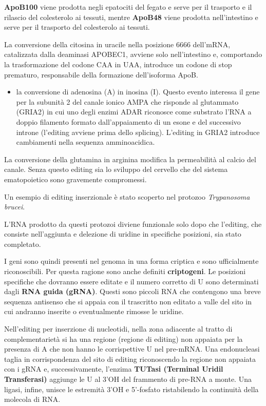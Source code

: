 \documentclass[11pt]{book}
\begin{document}
\textbf{ApoB100} viene prodotta negli epatociti del fegato e serve per
il trasporto e il rilascio del colesterolo ai tessuti, mentre
\textbf{ApoB48} viene prodotta nell'intestino e serve per il trasporto
del colesterolo ai tessuti.

La conversione della citosina in uracile nella posizione 6666 dell'mRNA,
catalizzata dalla deaminasi APOBEC1, avviene solo nell'intestino e,
comportando la trasformazione del codone CAA in UAA, introduce un codone
di stop prematuro, responsabile della formazione dell'isoforma ApoB.

\begin{itemize}
\itemsep1pt\parskip0pt
\item
  la conversione di adenosina (A) in inosina (I). Questo evento
  interessa il gene per la subunità 2 del canale ionico AMPA che
  risponde al glutammato (GRIA2) in cui uno degli enzimi ADAR riconosce
  come substrato l'RNA a doppio filamento formato dall'appaiamento di un
  esone e del successivo introne (l'editing avviene prima dello
  splicing). L'editing in GRIA2 introduce cambiamenti nella sequenza
  amminoacidica.
\end{itemize}

La conversione della glutamina in arginina modifica la permeabilità al
calcio del canale. Senza questo editing sia lo sviluppo del cervello che
del sistema ematopoietico sono gravemente compromessi.

Un esempio di editing inserzionale è stato scoperto nel protozoo
\emph{Trypanosoma brucei}.

L'RNA prodotto da questi protozoi diviene funzionale solo dopo che
l'editing, che consiste nell'aggiunta e delezione di uridine in
specifiche posizioni, sia stato completato.

I geni sono quindi presenti nel genoma in una forma criptica e sono
ufficialmente riconoscibili. Per questa ragione sono anche definiti
\textbf{criptogeni}. Le posizioni specifiche che dovranno essere editate
e il numero corretto di U sono determinati dagli \textbf{RNA guida
(gRNA)}. Questi sono piccoli RNA che contengono una breve sequenza
antisenso che si appaia con il trascritto non editato a valle del sito
in cui andranno inserite o eventualmente rimosse le uridine.

Nell'editing per inserzione di nucleotidi, nella zona adiacente al
tratto di complementarietà si ha una regione (regione di editing) non
appaiata per la presenza di A che non hanno le corrispettive U nel
pre-mRNA. Una endonucleasi taglia in corrispondenza del sito di editing
riconoscendo la regione non appaiata con i gRNA e, successivamente,
l'enzima \textbf{TUTasi (Terminal Uridil Transferasi)} aggiunge le U al
3'OH del frammento di pre-RNA a monte. Una ligasi, infine, unisce le
estremità 3'OH e 5'-fosfato ristabilendo la continuità della molecola di
RNA.
\end{document}
